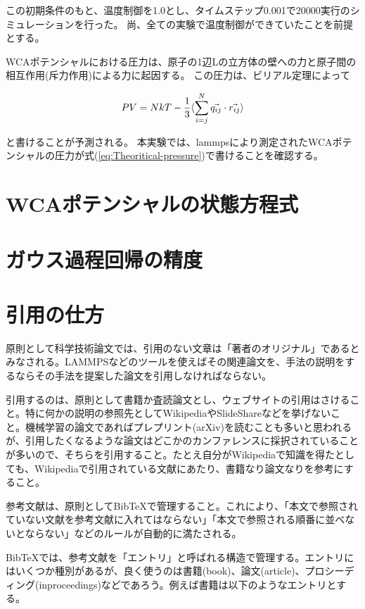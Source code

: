 \documentclass[titlepage]{jsreport}
\begin{document}
この初期条件のもと、温度制御を1.0とし、タイムステップ0.001で20000実行のシミュレーションを行った。
尚、全ての実験で温度制御ができていたことを前提とする。

WCAポテンシャルにおける圧力は、原子の1辺Lの立方体の壁への力と原子間の相互作用(斥力作用)による力に起因する。
この圧力は、ビリアル定理\cite{virial-therom}によって

\large
\begin{equation}
PV=NkT-{\frac{1}{3}}\langle\sum_{i=j}^N\vec{q_{ij}} \cdot \vec{r_{ij}}\rangle{\label{eq:Theoritical-pressure}}
\end{equation}
\normalsize

と書ける\cite{Theoritical-pressure}ことが予測される。
本実験では、lammpsにより測定されたWCAポテンシャルの圧力が式(\ref{eq:Theoritical-pressure})で書けることを確認する。



\section{WCAポテンシャルの状態方程式}

\section{ガウス過程回帰の精度}

\section{引用の仕方}

原則として科学技術論文では、引用のない文章は「著者のオリジナル」であるとみなされる。LAMMPSなどのツールを使えばその関連論文を、手法の説明をするならその手法を提案した論文を引用しなければならない。

引用するのは、原則として書籍か査読論文とし、ウェブサイトの引用はさけること。特に何かの説明の参照先としてWikipediaやSlideShareなどを挙げないこと。機械学習の論文であればプレプリント(arXiv)を読むことも多いと思われるが、引用したくなるような論文はどこかのカンファレンスに採択されていることが多いので、そちらを引用すること。たとえ自分がWikipediaで知識を得たとしても、Wikipediaで引用されている文献にあたり、書籍なり論文なりを参考にすること。

参考文献は、原則としてBibTeXで管理すること。これにより、「本文で参照されていない文献を参考文献に入れてはならない」「本文で参照される順番に並べないとならない」などのルールが自動的に満たされる。

BibTeXでは、参考文献を「エントリ」と呼ばれる構造で管理する。エントリにはいくつか種別があるが、良く使うのは書籍(book)、論文(article)、プロシーディング(inproceedings)などであろう。例えば書籍は以下のようなエントリとする。
\end{document}
